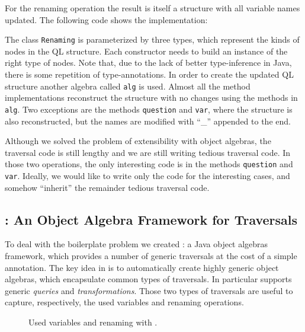 For the renaming operation the result is itself a structure
with all variable names updated. The following code shows the
implementation:


The class \lstinline{Renaming} is parameterized by three types,
which represent the kinds of nodes in the QL structure. Each
constructor needs to build an instance of the right type of nodes.
Note that, due to the lack of better type-inference in Java, there is
some repetition of type-annotations. In order to create the updated
QL structure another algebra called \lstinline{alg} is used.
Almost all the method implementations reconstruct the structure with
no changes using the methods in \lstinline{alg}. Two exceptions are the
methods \lstinline{question} and \lstinline{var}, where the structure is also reconstructed, but
the names are modified with ``\_'' appended to the end.

Although we solved the problem of extensibility with object
algebras, the traversal code is still lengthy and we are still writing
tedious traversal code. In those two operations, the only interesting code
is in the methods \lstinline{question} and \lstinline{var}. Ideally, we would like to write only
the code for the interesting cases, and somehow ``inherit'' the
remainder tedious traversal code.

\subsection{\Name: An Object Algebra Framework for Traversals}

To deal with the boilerplate problem we created \Name: a Java object
algebras framework, which provides a number of generic traversals at
the cost of a simple annotation. The key idea in \name is to
automatically create highly generic object algebras, which encapsulate
common types of traversals. In particular \name supports generic
\emph{queries} and \emph{transformations}. Those two types of
traversals are useful to capture, respectively, the used variables and
renaming operations.

\begin{figure}[b]
\nocaptionrule
\vspace{-.1in}
\caption{Used variables and renaming with \Name.}
\label{ql_with_oaframework}
\end{figure}

